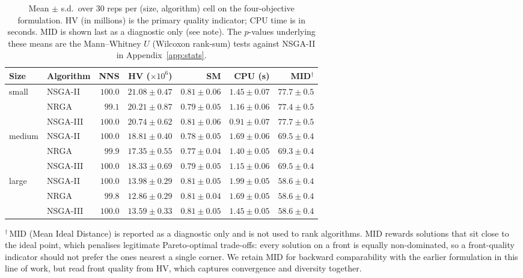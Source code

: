 \documentclass[applsci,article,submit,moreauthors,pdftex]{Definitions/mdpi}
\begin{document}
\begin{table}[!t]
\centering
\caption{Mean $\pm$ s.d.\ over 30 reps per (size, algorithm) cell on the
four-objective formulation. HV (in millions) is the primary quality indicator;
CPU time is in seconds. MID is shown last as a diagnostic only (see note). The
$p$-values underlying these means are the Mann--Whitney $U$ (Wilcoxon rank-sum)
tests against NSGA-II in Appendix~\ref{app:stats}.}
\label{tab:stats-summary}
\small
\begin{tabular}{l l r r r r r}
\toprule
Size & Algorithm & NNS & HV ($\times 10^6$) & SM & CPU (s) & MID$^{\dagger}$ \\
\midrule
\multirow{3}{*}{small}
  & NSGA-II  & $100.0$ & $21.08 \pm 0.47$ & $0.81 \pm 0.06$ & $1.45 \pm 0.07$ & $77.7 \pm 0.5$ \\
  & NRGA     & $99.1$  & $20.21 \pm 0.87$ & $0.79 \pm 0.05$ & $1.16 \pm 0.06$ & $77.4 \pm 0.5$ \\
  & NSGA-III & $100.0$ & $20.74 \pm 0.62$ & $0.81 \pm 0.06$ & $0.91 \pm 0.07$ & $77.7 \pm 0.5$ \\
\midrule
\multirow{3}{*}{medium}
  & NSGA-II  & $100.0$ & $18.81 \pm 0.40$ & $0.78 \pm 0.05$ & $1.69 \pm 0.06$ & $69.5 \pm 0.4$ \\
  & NRGA     & $99.9$  & $17.35 \pm 0.55$ & $0.77 \pm 0.04$ & $1.40 \pm 0.05$ & $69.3 \pm 0.4$ \\
  & NSGA-III & $100.0$ & $18.33 \pm 0.69$ & $0.79 \pm 0.05$ & $1.15 \pm 0.06$ & $69.5 \pm 0.4$ \\
\midrule
\multirow{3}{*}{large}
  & NSGA-II  & $100.0$ & $13.98 \pm 0.29$ & $0.81 \pm 0.05$ & $1.99 \pm 0.05$ & $58.6 \pm 0.4$ \\
  & NRGA     & $99.8$  & $12.86 \pm 0.29$ & $0.81 \pm 0.04$ & $1.69 \pm 0.05$ & $58.6 \pm 0.4$ \\
  & NSGA-III & $100.0$ & $13.59 \pm 0.33$ & $0.81 \pm 0.05$ & $1.45 \pm 0.05$ & $58.6 \pm 0.4$ \\
\bottomrule
\end{tabular}

\smallskip
{\footnotesize $^{\dagger}$\,MID (Mean Ideal Distance) is reported as a
diagnostic only and is not used to rank algorithms. MID rewards solutions that
sit close to the ideal point, which penalises legitimate Pareto-optimal
trade-offs: every solution on a front is equally non-dominated, so a
front-quality indicator should not prefer the ones nearest a single corner. We
retain MID for backward comparability with the earlier formulation in this line
of work, but read front quality from HV, which captures convergence and
diversity together.}
\end{table}
\end{document}
